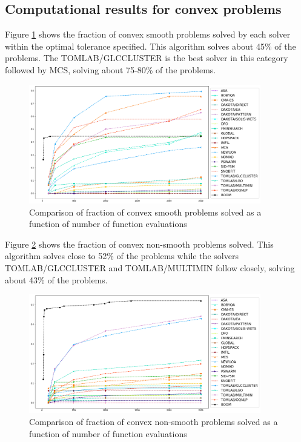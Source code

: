 \subsection{Computational results for convex problems}

Figure \ref{fig:ConvexSmooth} shows the fraction of convex smooth problems solved by each solver within the optimal tolerance specified. This algorithm solves about 45\% of the problems. The TOMLAB/GLCCLUSTER is the best solver in this category followed by MCS, solving about 75-80\% of the problems. 

\begin{figure}[h]
\includegraphics[width=0.9\textwidth]{img/cvx_sm.png}
\caption{Comparison of fraction of convex smooth problems solved as a function of number of function evaluations}
\label{fig:ConvexSmooth}
\end{figure}

\bigskip
\noindent
Figure \ref{fig:ConvexNonSmooth} shows the fraction of convex non-smooth problems solved. This algorithm solves close to 52\% of the problems while the solvers TOMLAB/GLCCLUSTER and TOMLAB/MULTIMIN follow closely, solving about 43\% of the problems. 

\begin{figure}
\includegraphics[width=0.9\textwidth]{img/cvx_nsm.png}
\caption{Comparison of fraction of convex non-smooth problems solved as a function of number of function evaluations}
\label{fig:ConvexNonSmooth}
\end{figure}

